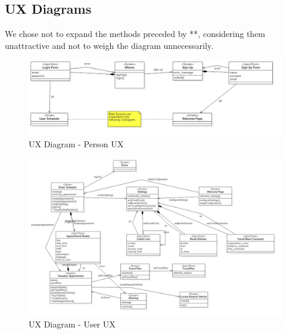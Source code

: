 \subsection{UX Diagrams}
We chose not to expand the methods preceded by **, considering them unattractive and not to weigh the diagram unnecessarily.

	\begin{figure}[H]	
		\centerline{\includegraphics[width=0.9\paperwidth]{Images/UxPerson}}
		\caption{UX Diagram - Person UX}
	\end{figure}	
	\begin{figure}[H]	
		\centerline{\includegraphics[width=0.9\paperwidth]{Images/UxUser}}
		\caption{UX Diagram - User UX}
	\end{figure}